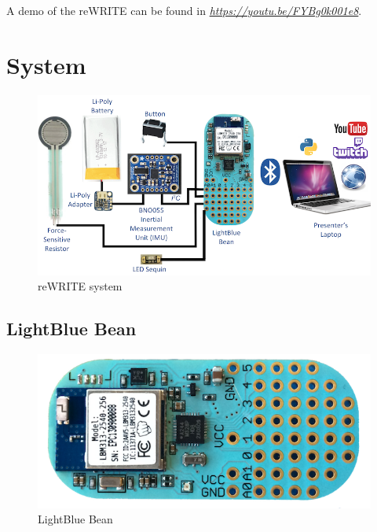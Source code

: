 \documentclass[10pt,journal]{IEEEtran}
\begin{document}
\par A demo of the reWRITE can be found in \textit{\url{https://youtu.be/FYBg0k001e8}}.

\section{System}

\begin{figure}[H]
  \centering
    \includegraphics[width=\linewidth]{figures/system}
  \caption{reWRITE system}
  \label{fig:system}
\end{figure}

\subsection{LightBlue Bean}

\begin{figure}[H]
  \centering
    \includegraphics[width=0.8\linewidth]{figures/bean}
  \caption{LightBlue Bean}
  \label{fig:bean}
\end{figure}
\end{document}
